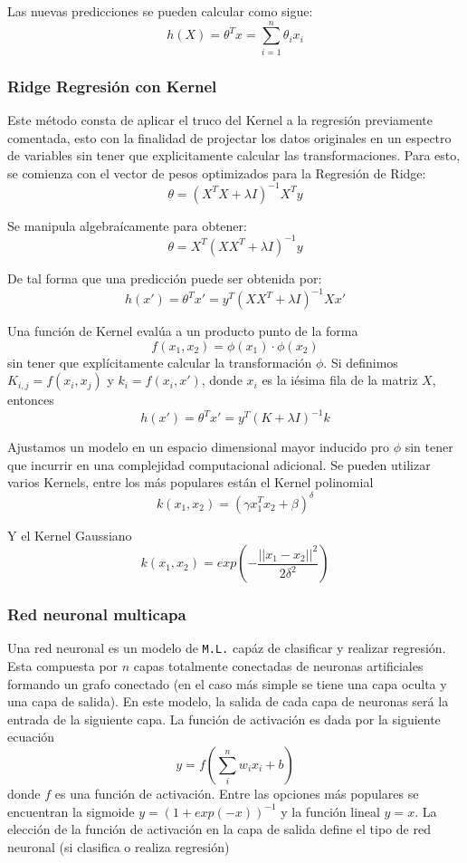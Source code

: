 {Las nuevas predicciones se pueden calcular como sigue: $$h(X) = \theta^Tx=\sum_{i=1}^{n} \theta_ix_i$$

\subsubsection*{Ridge Regresión con Kernel}

Este método consta de aplicar el truco del Kernel a la regresión previamente comentada, esto con la finalidad de projectar los datos originales en un espectro de variables sin tener que explicitamente calcular las transformaciones. Para esto, se comienza con el vector de pesos optimizados para la Regresión de Ridge: $$\theta = (X^TX+\lambda I)^{-1} X^T y$$

Se manipula algebraícamente para obtener: $$\theta = X^T(XX^T + \lambda I)^{-1}y$$

De tal forma que una predicción puede ser obtenida por: $$h(x') = \theta^Tx' = y^T(XX^T + \lambda I)^{-1}Xx'$$

Una función de Kernel evalúa a un producto punto de la forma $$f(x_1,x_2) = \phi (x_1)\cdot \phi (x_2)$$ sin tener que explícitamente calcular la transformación $\phi$. Si definimos $K_{i,j}=f(x_i,x_j)$ y $k_i = f(x_i,x')$, donde $x_i$ es la iésima fila de la matriz $X$, entonces $$h(x') = \theta^Tx' = y^T(K + \lambda I)^{-1}k$$

Ajustamos un modelo en un espacio dimensional mayor inducido pro $\phi$ sin tener que incurrir en una complejidad computacional adicional. Se pueden utilizar varios Kernels, entre los más populares están el Kernel polinomial $$k(x_1,x_2)=( \gamma x_{1}^{T} x_2 + \beta)^ {\delta}$$

Y el Kernel Gaussiano $$k(x_1,x_2)=exp(-\frac{||x_1-x_2||^2}{2{\delta}^2})$$

\subsubsection*{Red neuronal multicapa}

Una red neuronal es un modelo de \texttt{M.L.} capáz de clasificar y realizar regresión. Esta compuesta por $n$ capas totalmente conectadas de neuronas artificiales formando un grafo conectado (en el caso más simple se tiene una capa oculta y una capa de salida). En este modelo, la salida de cada capa de neuronas será la entrada de la siguiente capa. La función de activación es dada por la siguiente ecuación $$y=f(\sum_{i}^{n} w_ix_i+b)$$ donde $f$ es una función de activación. Entre las opciones más populares se encuentran la sigmoide $y = (1+exp(-x))^{-1}$ y la función lineal $y=x$. La elección de la función de activación en la capa de salida define el tipo de red neuronal (si clasifica o realiza regresión)

}
